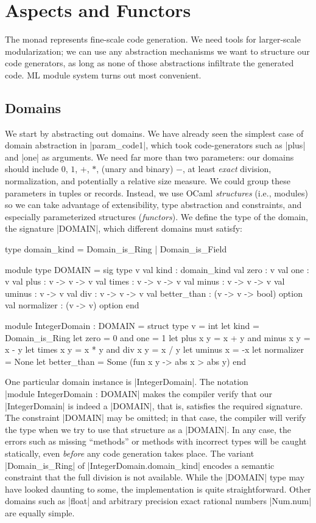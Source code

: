 \documentclass[draft]{elsart}
\begin{document}
\section{Aspects and Functors}\label{functors}

The monad represents fine-scale code generation. We need tools for
larger-scale modularization; we can use any abstraction
mechanisms we want to structure our code generators, as long as none
of those abstractions infiltrate the generated code. ML module system
turns out most convenient.


\subsection{Domains}

We start by abstracting out domains. We have already seen the simplest
case of domain abstraction in |param_code1|, which took
code-generators such as |plus| and |one| as arguments.  We need far
more than two parameters: our domains should include $0$, $1$, $+$,
$*$, (unary and binary) $-$, at least \emph{exact} division,
normalization, and potentially a relative size measure. We could group
these parameters in tuples or records.  Instead, we use OCaml
\emph{structures} (i.e., modules) so we can take advantage of
extensibility, type abstraction and constraints, and especially
parameterized structures (\emph{functors}).  We define the type of the
domain, the signature |DOMAIN|, which different domains must satisfy:

\begin{code}
type domain_kind = Domain_is_Ring | Domain_is_Field

module type DOMAIN = sig
  type v
  val kind : domain_kind
  val zero : v
  val one : v
  val plus : v -> v -> v
  val times : v -> v -> v
  val minus : v -> v -> v
  val uminus : v -> v
  val div : v -> v -> v
  val better_than : (v -> v -> bool) option
  val normalizer : (v -> v) option
end 

module IntegerDomain : DOMAIN = struct
    type v = int
    let kind = Domain_is_Ring
    let zero = 0 and one = 1
    let plus x y = x + y  and  minus x y = x - y
    let times x y = x * y and  div x y = x / y
    let uminus x = -x
    let normalizer = None
    let better_than = Some (fun x y -> abs x > abs y)
end
\end{code}

One particular domain instance is |IntegerDomain|. The notation\\
|module IntegerDomain : DOMAIN| makes the compiler verify that our
|IntegerDomain| is indeed a |DOMAIN|, that is, satisfies the required
signature. The constraint |DOMAIN| may be omitted; in that case, the
compiler will verify the type when we try to use that structure as a
|DOMAIN|. In any case, the errors such as missing ``methods'' or
methods with incorrect types will be caught statically, even
\emph{before} any code generation takes place. The variant
|Domain_is_Ring| of |IntegerDomain.domain_kind| encodes a semantic constraint 
that the full division
is not available. While the |DOMAIN| type may have looked daunting to
some, the implementation is quite straightforward.  Other domains such
as |float| and arbitrary precision exact rational numbers |Num.num|
are equally simple.
\end{document}
